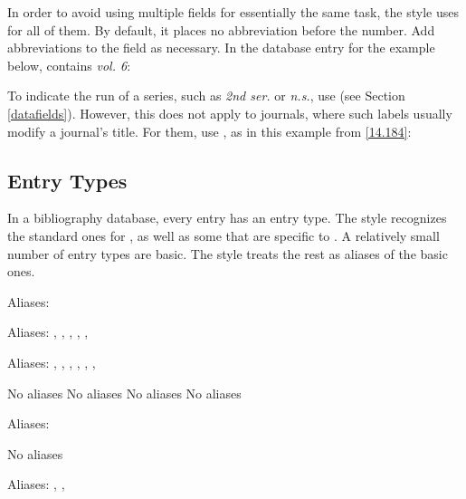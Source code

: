 \documentclass[11pt,letterpaper,oneside]{article}
\begin{document}
In order to avoid using multiple fields for essentially the same task,
the style uses  for all of them. By default, it
places no abbreviation before the number. Add abbreviations to the
field as necessary. In the database entry for the example below,
 contains \textit{vol. 6}:

\begin{citebib}
\item \cite{cochrane1987}
\end{citebib}

To indicate the run of a series, such as \textit{2nd ser.} or
\textit{n.s.}, use  (see Section
\ref{datafields}). However, this does not apply to journals, where
such labels usually modify a journal's title. For them, use
, as in this example from \ref{14.184}:

\begin{citebib}
\item \cite{moraes1950}
\end{citebib}

\subsection{Entry Types}
\label{entrytypes}

In a bibliography database, every entry has an entry type. The style
recognizes the standard ones for \BibTeX, as well as some that are
specific to \biblatex. A relatively small number of entry types are
basic. The style treats the rest as aliases of the basic ones.

\begin{typelist}
\RaggedRight


Aliases: 


Aliases: , , ,
, , 


Aliases: , ,
, , ,
, 

 No aliases
 No aliases
 No aliases
 No aliases


Aliases: 

 No aliases


Aliases: , ,

\end{typelist}
\end{document}
